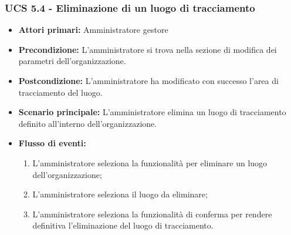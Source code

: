 \subsubsection{UCS 5.4 - Eliminazione di un luogo di tracciamento}%
\begin{itemize}
    \item \textbf{Attori primari:} Amministratore gestore
    \item \textbf{Precondizione:} L'amministratore si trova nella sezione di modifica dei parametri dell'organizzazione.
    \item \textbf{Postcondizione:} L'amministratore ha modificato con successo l'area di tracciamento del luogo.
    \item \textbf{Scenario principale:} L'amministratore elimina un luogo di tracciamento definito all'interno dell'organizzazione.
    \item \textbf{Flusso di eventi:}
    \begin{enumerate}%
        \item L'amministratore seleziona la funzionalità per eliminare un luogo dell'organizzazione;
        \item L'amministratore seleziona il luogo da eliminare;
        \item L'amministratore seleziona la funzionalità di conferma per rendere definitiva l'eliminazione del luogo di tracciamento.
    \end{enumerate}
\end{itemize}

